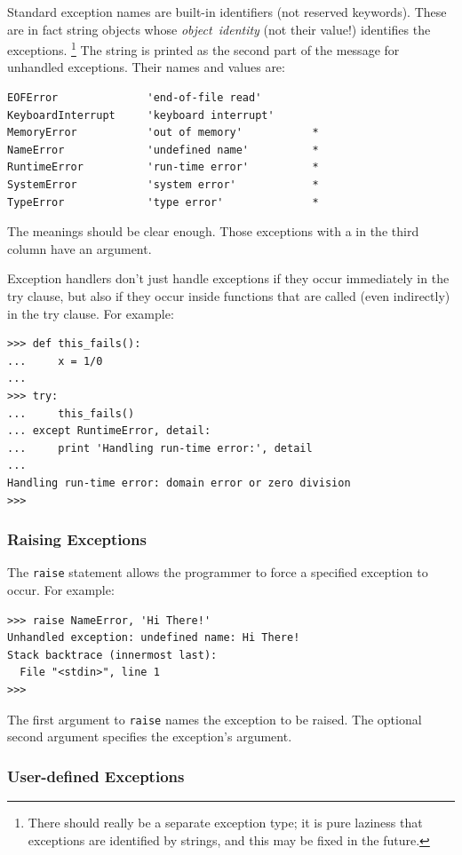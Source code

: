 Standard exception names are built-in identifiers (not reserved
keywords).
These are in fact string objects whose
{\em object\ identity}
(not their value!) identifies the exceptions.%
\footnote{
	There should really be a separate exception type; it is pure
	laziness that exceptions are identified by strings, and this may
	be fixed in the future.
}
The string is printed as the second part of the message for unhandled
exceptions.
Their names and values are:
\bcode\begin{verbatim}
EOFError              'end-of-file read'
KeyboardInterrupt     'keyboard interrupt'
MemoryError           'out of memory'           *
NameError             'undefined name'          *
RuntimeError          'run-time error'          *
SystemError           'system error'            *
TypeError             'type error'              *
\end{verbatim}\ecode
The meanings should be clear enough.
Those exceptions with a {\tt *} in the third column have an argument.

Exception handlers don't just handle exceptions if they occur
immediately in the try clause, but also if they occur inside functions
that are called (even indirectly) in the try clause.
For example:
\bcode\begin{verbatim}
>>> def this_fails():
...     x = 1/0
... 
>>> try:
...     this_fails()
... except RuntimeError, detail:
...     print 'Handling run-time error:', detail
... 
Handling run-time error: domain error or zero division
>>> 
\end{verbatim}\ecode

\subsubsection{Raising Exceptions}

The {\tt raise} statement allows the programmer to force a specified
exception to occur.
For example:
\bcode\begin{verbatim}
>>> raise NameError, 'Hi There!'
Unhandled exception: undefined name: Hi There!
Stack backtrace (innermost last):
  File "<stdin>", line 1
>>> 
\end{verbatim}\ecode
The first argument to {\tt raise} names the exception to be raised.
The optional second argument specifies the exception's argument.

\subsubsection{User-defined Exceptions}

